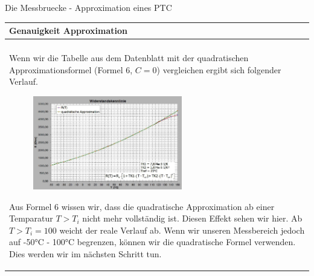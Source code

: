 \begin{frame}[t]{Die Messbruecke - Approximation eines PTC} 
    
    \begin{spacing}{0.9} \begin{tiny}
      \begin{table}[h!]
      \begin{tabular}{p{10cm}}
        \hline
        \textbf{Genauigkeit Approximation} \\
        \hline \\
        \begin{minipage}{\textwidth}
            Wenn wir die Tabelle aus dem Datenblatt mit der quadratischen Approximationsformel (Formel 6, $C=0$) vergleichen ergibt sich folgender Verlauf.
            \begin{figure}
                \centering
                \includegraphics[width=0.6\textwidth]{pictures/kty81_approx_accuracy.png}
            \end{figure}
            Aus Formel 6 wissen wir, dass die quadratische Approximation ab einer Temparatur $T>T_i$ nicht mehr vollständig ist. 
            Diesen Effekt sehen wir hier. Ab $T>T_i=100$ weicht der reale Verlauf ab. Wenn wir unseren Messbereich jedoch auf -50$°$C - 100$°$C begrenzen, können
            wir die quadratische Formel verwenden. \newline\newline Dies werden wir im nächsten Schritt tun. 
        \end{minipage} 
    \end{tabular}

    \end{table}
     
    \end{tiny} \end{spacing}

\end{frame}

